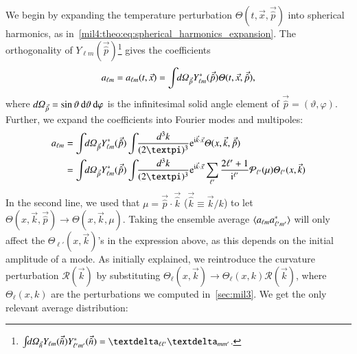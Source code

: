 We begin by expanding the temperature perturbation $\Theta(t, \vec{x}, \vec{\hat{p}})$ into spherical harmonics, as in~\cref{mil4:theo:eq:spherical_harmonics_expansion}.
The orthogonality of $Y_{\ell m}(\vec{\hat{p}})$\footnote{$\int \dOmg[n] Y\ellm(\vec{\hat{n}}) Y\ellmp^*(\vec{\hat{n}}) = \deltasym{\ell \ell'} \deltasym{m m'} $.} gives the coefficients
\begin{equation}
    a\ellm = a\ellm(t,\vec{x}) = \int \dOmg[p] Y^*_{\ell m} (\vec{\hat{p}}) \Theta(t, \vec{x}, \vec{\hat{p}}),
\end{equation}
where $d\varOmega_{\vec{\hat{p}}} = \sin{\vartheta} \diff \vartheta\diff \varphi$ is the infinitesimal solid angle element of $\vec{\hat{p}} = (\vartheta, \varphi)$. Further, we expand the coefficients into Fourier modes and multipoles:
\begin{equation}\label{mil4:theo:eq:a_ellm_expansions}
\begin{split}
    a_{\ell m} &= \int \dOmg[p] Y^*_{\ell m} (\vec{\hat{p}}) \int \dkkk \eu[\im \vec{k}\cdot \vec{x}] \Theta(x, \vec{k}, \vec{\hat{p}})  \\
    &= \int \dOmg[p] Y^*_{\ell m} (\vec{\hat{p}}) \int \dkkk \eu[\im \vec{k}\cdot \vec{x}]\sum_{\ell'} \frac{2\ell' + 1}{\im^{\ell'}} \mathcal{P}_{\ell'}(\mu) \Theta_{\ell'}(x, \vec{k})
\end{split}
\end{equation}
In the second line, we used that $\mu=\vec{\hat{p}}\cdot\vec{\hat{k}}$ ($\vec{\hat{k}}\equiv \vec{k}/k$) to let $\Theta(x,\vec{k}, \vec{\hat{p}}) \to\Theta(x,\vec{k},\mu) $. Taking the ensemble average $\langle a\ellm a^*\ellmp \rangle$ will only affect the $\Theta_{\ell'}(x, \vec{k})$'s in the expression above, as this depends on the initial amplitude of a mode. As initially explained, we reintroduce the curvature perturbation $\mathcal{R}(\vec{k})$ by substituting $\Theta_\ell(x,\vec{k}) \to \Theta_\ell(x,k) \mathcal{R}(\vec{k})$, where $\Theta_\ell(x, k)$ are the perturbations we computed in~\cref{sec:mil3}. We get the only relevant average distribution:


